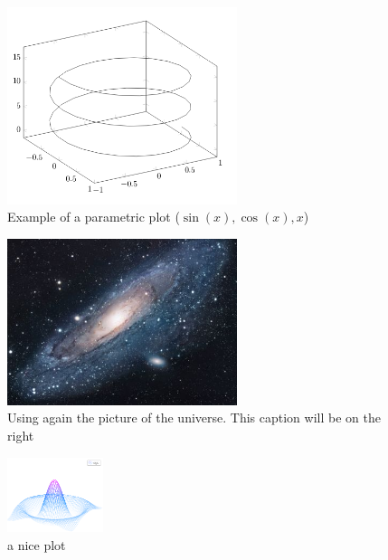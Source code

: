 \documentclass{article}
\begin{document}
\newpage

\begin{figure}[h]
\caption{Example of a parametric plot ($\sin (x), \cos(x), x$)}
\centering
\includegraphics[width=0.6\textwidth]{spiral}
\end{figure}

\vspace{1.5cm}

\begin{figure}
\caption{Using again the picture of the universe. 
         This caption will be on the right}
\includegraphics[width=0.6\textwidth]{universe}
\end{figure}


\newpage

\begin{figure}[h]
    \centering
    \includegraphics[width=0.25\textwidth]{mesh}
    \caption{a nice plot}
    \label{fig:mesh1}
\end{figure}
\end{document}
